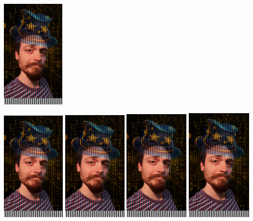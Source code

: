 \documentclass{article}
\begin{document}
\includegraphics[width=1.25in]{mag_gi_interlaced_horizontal.png}


\includegraphics[width=1.26in]{mag_gi_interlaced_horizontal.png}
\includegraphics[width=1.27in]{mag_gi_interlaced_horizontal.png}
\includegraphics[width=1.28in]{mag_gi_interlaced_horizontal.png}
\includegraphics[width=1.29in]{mag_gi_interlaced_horizontal.png}
\end{document}
